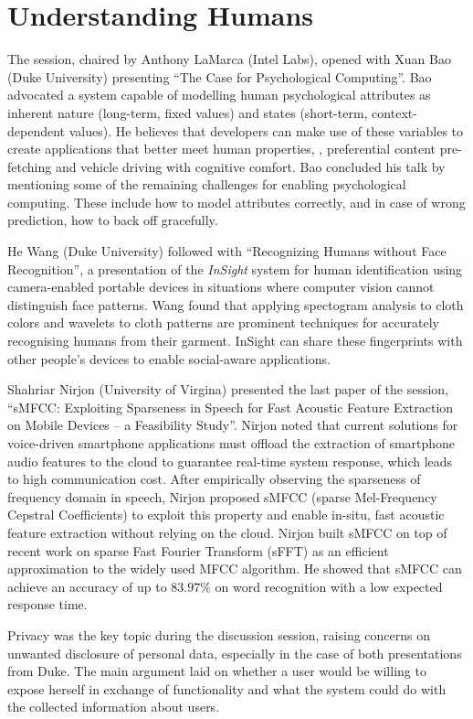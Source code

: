 \section{Understanding Humans}
\label{sec:humans}

The session, chaired by Anthony LaMarca (Intel Labs), opened with Xuan
Bao (Duke University) presenting ``The Case for Psychological
Computing''. Bao advocated a system capable of modelling human psychological
attributes as inherent nature (long-term, fixed values) and states
(short-term, context-dependent values). He believes that developers can
make use of these variables to create applications that better meet
human properties, \eg, preferential content pre-fetching and vehicle
driving with cognitive comfort. Bao concluded his talk by mentioning
some of the remaining challenges for enabling psychological computing.
These include how to model attributes correctly, and in case of wrong
prediction, how to back off gracefully.

He Wang (Duke University) followed with ``Recognizing Humans without Face
Recognition'', a presentation of the \emph{InSight} system for human
identification using camera-enabled portable devices in situations where
computer vision cannot distinguish face patterns. Wang found that
applying spectogram analysis to cloth colors and wavelets to cloth
patterns are prominent techniques for accurately recognising humans from
their garment. InSight can share these fingerprints with other people's
devices to enable social-aware applications.

Shahriar Nirjon (University of Virgina) presented the last paper of
the session, ``sMFCC: Exploiting Sparseness in Speech for Fast Acoustic
Feature Extraction on Mobile Devices -- a Feasibility Study''. Nirjon
noted that current solutions for voice-driven smartphone applications
must offload the extraction of smartphone audio features to the cloud to
guarantee real-time system response, which leads to high communication
cost. After empirically observing the sparseness of frequency domain in
speech, Nirjon proposed sMFCC (sparse Mel-Frequency Cepstral
Coefficients) to exploit this property and enable in-situ, fast
acoustic feature extraction without relying on the cloud. Nirjon built
sMFCC on top of recent work on sparse Fast Fourier Transform (sFFT) as
an efficient approximation to the widely used MFCC algorithm. He showed
that sMFCC can achieve an accuracy of up to $83.97\%$ on word
recognition with a low expected response time.

Privacy was the key topic during the discussion session, raising
concerns on unwanted disclosure of personal data, especially in the case
of both presentations from Duke. The main argument laid on whether a
user would be willing to expose herself in exchange of functionality and
what the system could do with the collected information about users.
